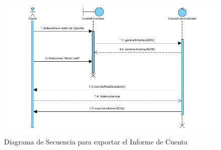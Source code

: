 \newpage %

\begin{figure}[H]
    \includegraphics[width=1\linewidth]{assets/sequence/RF1.9.1_ExportarInformeCuenta.png}
    \caption{Diagrama de Secuencia para exportar el Informe de Cuenta}
   \end{figure}
\vspace{1.0cm}

\newpage %